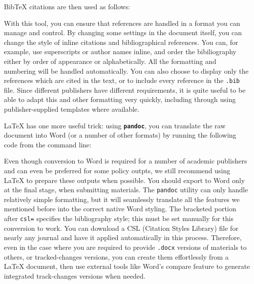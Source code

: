 
\noindent BibTeX citations are then used as follows:


With this tool, you can ensure that references are handled
in a format you can manage and control.\cite{flom2005latex}
By changing some settings in the document itself,
you can change the style of inline citations and bibliographical references.
You can, for example, use superscripts or author names inline,
and order the bibiliography either by order of appearance or alphabetically.
All the formatting and numbering will be handled automatically.
You can also choose to display only the references which are cited in the text,
or to include every reference in the \texttt{.bib} file.
Since different publishers have different requirements,
it is quite useful to be able to adapt this and other formatting very quickly,
including through using publisher-supplied templates where available.

{\LaTeX} has one more useful trick:
using \textbf{\texttt{pandoc}},
you can translate the raw document into Word
(or a number of other formats)
by running the following code from the command line:


\noindent Even though conversion to Word is required
for a number of academic publishers and can even be preferred for some policy outpts,
we still recommend using {\LaTeX} to prepare these outputs when possible.
You should export to Word only at the final stage, when submitting materials.
The \texttt{pandoc} utility can only handle relatively simple formatting,
but it will seamlessly translate all the features we mentioned before
into the correct native Word styling.
The bracketed portion after \texttt{csl=} specifies the bibliography style;
this must be set manually for this conversion to work.
You can download a CSL (Citation Styles Library) file
for nearly any journal and have it applied automatically in this process.
Therefore, even in the case where you are required to provide
\texttt{.docx} versions of materials to others, or tracked-changes versions,
you can create them effortlessly from a {\LaTeX} document,
then use external tools like Word's compare feature
to generate integrated track-changes versions when needed.


